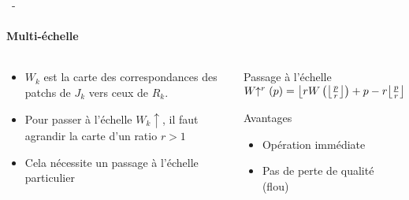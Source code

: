 \documentclass[aspectratio=169, 22pt]{beamer}
\DeclarePairedDelimiter\floor{\lfloor}{\rfloor}
\begin{document}
\begin{frame}{\secname~- \subsecname}
  \framesubtitle{Multi-échelle}
  \begin{columns}
    \begin{column}{0.5\linewidth}
      \begin{itemize}
      \item $W_k$ est la carte des correspondances des patchs de $J_k$ vers ceux de $R_k$.
      \item Pour passer à l'échelle $W_k\!\uparrow$, il faut agrandir la carte d'un ratio $r > 1$
      \item Cela nécessite un passage à l'échelle particulier
      \end{itemize}
    \end{column}
    \begin{column}{0.5\linewidth}
      \begin{block}{Passage à l'échelle}
        \centering
        $W\!\!\uparrow^r(p) = \floor*{rW\left(\floor*{\frac{p}{r}}\right) + p - r\floor*{\frac{p}{r}}}$
      \end{block}
      \vspace{1em}
      \begin{exampleblock}{Avantages}
        \begin{itemize}
        \item Opération immédiate
        \item Pas de perte de qualité (flou)
        \end{itemize}
      \end{exampleblock}
    \end{column}
  \end{columns}
\end{frame}
\end{document}
